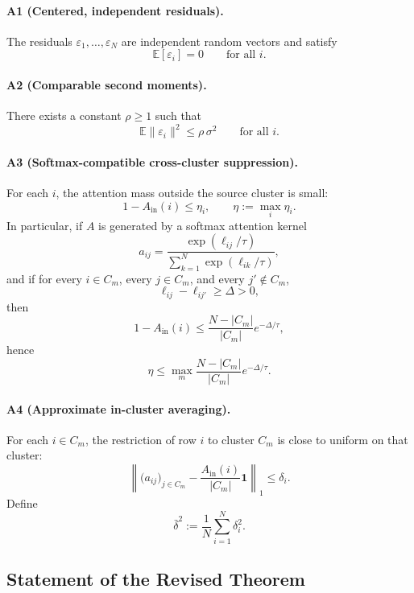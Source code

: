 \paragraph{A1 (Centered, independent residuals).}
The residuals $\varepsilon_1,\dots,\varepsilon_N$ are independent random vectors and satisfy
\[
\mathbb{E}[\varepsilon_i] = 0
\qquad \text{for all } i.
\]

\paragraph{A2 (Comparable second moments).}
There exists a constant $\rho \ge 1$ such that
\[
\mathbb{E}\|\varepsilon_i\|^2 \le \rho\,\sigma^2
\qquad \text{for all } i.
\]

\paragraph{A3 (Softmax-compatible cross-cluster suppression).}
For each $i$, the attention mass outside the source cluster is small:
\[
1 - A_{\mathrm{in}}(i) \le \eta_i,
\qquad
\eta := \max_i \eta_i.
\]
In particular, if $A$ is generated by a softmax attention kernel
\[
a_{ij} = \frac{\exp(\ell_{ij}/\tau)}{\sum_{k=1}^N \exp(\ell_{ik}/\tau)},
\]
and if for every $i\in C_m$, every $j\in C_m$, and every $j'\notin C_m$,
\[
\ell_{ij} - \ell_{ij'} \ge \Delta > 0,
\]
then
\[
1 - A_{\mathrm{in}}(i)
\le
\frac{N-|C_m|}{|C_m|} e^{-\Delta/\tau},
\]
hence
\[
\eta \le \max_m \frac{N-|C_m|}{|C_m|} e^{-\Delta/\tau}.
\]

\paragraph{A4 (Approximate in-cluster averaging).}
For each $i\in C_m$, the restriction of row $i$ to cluster $C_m$ is close to uniform on that cluster:
\[
\left\|
\bigl(a_{ij}\bigr)_{j\in C_m}
-
\frac{A_{\mathrm{in}}(i)}{|C_m|}\mathbf{1}
\right\|_1
\le \delta_i.
\]
Define
\[
\bar{\delta}^2 := \frac{1}{N}\sum_{i=1}^N \delta_i^2.
\]

\subsection{Statement of the Revised Theorem}

